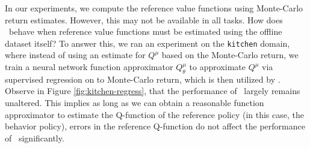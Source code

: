 In our experiments, we compute the reference value functions using Monte-Carlo return estimates. However, this may not be available in all tasks. How does \methodname\ behave when reference value functions must be estimated using the offline dataset itself? To answer this, we ran an experiment on the \texttt{kitchen} domain, where instead of using an estimate for $Q^\mu$ based on the Monte-Carlo return, we train a neural network function approximator $Q^\mu_\theta$ to approximate $Q^\mu$ via supervised regression on to Monte-Carlo return, which is then utilized by \methodname. 
Observe in Figure \ref{fig:kitchen-regress}, that the performance of \methodname\ largely remains unaltered. This implies as long as we can obtain a reasonable function approximator to estimate the Q-function of the reference policy (in this case, the behavior policy), errors in the reference Q-function do not affect the performance of \methodname\ significantly.

\vspace{-0.2cm}
